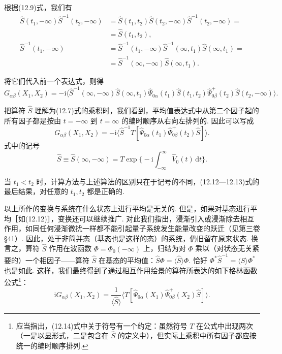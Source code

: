 根据(12.9)式，我们有
\begin{equation*}
\begin{aligned}
\hat S(t_1,-\infty)\hat S^{-1}(t_2,-\infty)&=\hat S(t_1,t_2)\hat S(t_2,-\infty)\hat S^{-1}(t_2,-\infty)=\\
&=\hat S(t_1,t_2),\\
\hat S^{-1}(t_1,-\infty)&=\hat S^{-1}(t_1,-\infty)\hat S^{-1}(\infty,t_1)\hat S(\infty,t_1)=\\
&=\hat S^{-1}(\infty,-\infty)\hat S(\infty,t_1).
\end{aligned}
\end{equation*}

将它们代入前一个表达式，则得
\begin{equation*}
G_{\alpha\beta}(X_1,X_2)=-\mathrm{i}\big\langle\hat S^{-1}(\infty,-\infty)\hat S(\infty,t_1)\hat\Psi_{0\alpha}(t_1)\hat S(t_1,t_2)\hat\Psi^{+}_{0\beta}(t_2)\hat S(t_2,-\infty)\big\rangle.
\end{equation*}

把算符 $\hat S$ 理解为(12.7)式的乘积时，我们看到，平均值表达式中从第二个因子起的所有因子都是按由 $t=-\infty$ 到 $t=\infty$ 的编时顺序从右向左排列的. 因此可以写成
\begin{equation}
G_{\alpha\beta}(X_1,X_2)=-\mathrm{i}\langle\hat S^{-1}T[\hat\Psi_{0\alpha}(t_1)\hat\Psi^{+}_{0\beta}(t_2)\hat S]\rangle.
\end{equation}
式中的记号
\begin{equation}
\hat S\equiv\hat S(\infty,-\infty)=T\exp\Big\{-\mathrm{i}\int_{-\infty}^{\infty}\hat V_0(t)\,\mathrm{d}t\Big\}.
\end{equation}

当 $t_1<t_2$ 时，计算方法与上述算法的区别只在于记号的不同，(12.12—12.13)式的最后结果，对任意的 $t_1,t_2$ 都是正确的.

以上所作的变换与系统在什么状态上进行平均是无关的. 但是，如果对基态进行平均［如(12.12)］，变换还可以继续推广. 对此我们指出，浸渐引入或浸渐除去相互作用，如同任何浸渐微扰一样都不能引起量子系统发生能量改变的跃迁（见第三卷§41）. 因此，处于非简并态（基态也是这样的态）的系统，仍旧留在原来状态. 换言之，算符 $\hat S$ 作用在波函数 $\varPhi=\varPhi_0(-\infty)$ 上，归结为对 $\varPhi$ 乘以（对状态无关紧要的）一个相因子——算符 $\hat S$ 在基态的平均值：$\hat S\varPhi=\langle\hat S\rangle\varPhi$. 恰好 $\varPhi^{*}\hat S^{-1}=\langle S\rangle\varPhi^{*}$ 也是如此. 这样，我们最终得到了通过相互作用绘景的算符所表达的如下格林函数公式\footnote{应当指出，(12.14)式中关于符号有一个约定：虽然符号 $T$ 在公式中出现两次（一是以显形式，二是包含在 $\hat S$ 的定义中），但实际上乘积中所有因子都应按统一的编时顺序排列.}：
\begin{equation}
\mathrm{i}G_{\alpha\beta}(X_1,X_2)=\frac{1}{\langle\hat S\rangle}\big\langle T[\hat\Psi_{0\alpha}(X_1)\hat\Psi^{+}_{0\beta}(X_2)\hat S]\big\rangle.
\end{equation}

